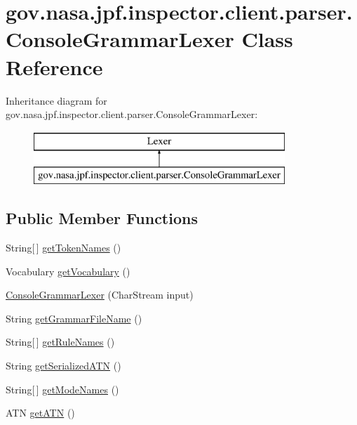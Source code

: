 \hypertarget{classgov_1_1nasa_1_1jpf_1_1inspector_1_1client_1_1parser_1_1_console_grammar_lexer}{}\section{gov.\+nasa.\+jpf.\+inspector.\+client.\+parser.\+Console\+Grammar\+Lexer Class Reference}
\label{classgov_1_1nasa_1_1jpf_1_1inspector_1_1client_1_1parser_1_1_console_grammar_lexer}
Inheritance diagram for gov.\+nasa.\+jpf.\+inspector.\+client.\+parser.\+Console\+Grammar\+Lexer\+:\begin{figure}[H]
\begin{center}
\leavevmode
\includegraphics[height=2.000000cm]{classgov_1_1nasa_1_1jpf_1_1inspector_1_1client_1_1parser_1_1_console_grammar_lexer}
\end{center}
\end{figure}
\subsection*{Public Member Functions}
\begin{DoxyCompactItemize}
\item 
String\mbox{[}$\,$\mbox{]} \hyperlink{classgov_1_1nasa_1_1jpf_1_1inspector_1_1client_1_1parser_1_1_console_grammar_lexer_a1132d9b948368b24de0000892a0714ca}{get\+Token\+Names} ()
\item 
Vocabulary \hyperlink{classgov_1_1nasa_1_1jpf_1_1inspector_1_1client_1_1parser_1_1_console_grammar_lexer_a67308eb241be5df39feb29e0b24c95dd}{get\+Vocabulary} ()
\item 
\hyperlink{classgov_1_1nasa_1_1jpf_1_1inspector_1_1client_1_1parser_1_1_console_grammar_lexer_a96c53d459b0715bde869bad42bdb8fbb}{Console\+Grammar\+Lexer} (Char\+Stream input)
\item 
String \hyperlink{classgov_1_1nasa_1_1jpf_1_1inspector_1_1client_1_1parser_1_1_console_grammar_lexer_a207973465df4d0f2619926f55331fee4}{get\+Grammar\+File\+Name} ()
\item 
String\mbox{[}$\,$\mbox{]} \hyperlink{classgov_1_1nasa_1_1jpf_1_1inspector_1_1client_1_1parser_1_1_console_grammar_lexer_a8ddd71fc0667dac561799a91a8abb32f}{get\+Rule\+Names} ()
\item 
String \hyperlink{classgov_1_1nasa_1_1jpf_1_1inspector_1_1client_1_1parser_1_1_console_grammar_lexer_a312dcf5a5c891a92de3375c3c86c6c89}{get\+Serialized\+A\+TN} ()
\item 
String\mbox{[}$\,$\mbox{]} \hyperlink{classgov_1_1nasa_1_1jpf_1_1inspector_1_1client_1_1parser_1_1_console_grammar_lexer_a8a56d698d4ab21cd9692051ee2b9067c}{get\+Mode\+Names} ()
\item 
A\+TN \hyperlink{classgov_1_1nasa_1_1jpf_1_1inspector_1_1client_1_1parser_1_1_console_grammar_lexer_aaa0e1cc59c59ad9dc8ee9a8e41ecb884}{get\+A\+TN} ()
\end{DoxyCompactItemize}
